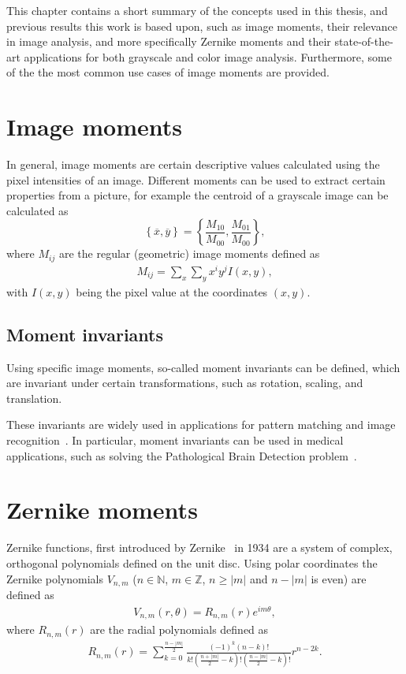 This chapter contains a short summary of the concepts used in this thesis, and previous results this work is based upon, such as image moments, their relevance in image analysis, and more specifically Zernike moments and their state-of-the-art applications for both grayscale and color image analysis. Furthermore, some of the the most common use cases of image moments are provided.

\section{Image moments}
In general, image moments are certain descriptive values calculated using the pixel intensities of an image. Different moments can be used to extract certain properties from a picture, for example the centroid of a grayscale image can be calculated as
$$
\left\{ \overline{x}, \overline{y} \right\} = \left\{ \frac{M_{10}}{M_{00}},  \frac{M_{01}}{M_{00}} \right\},
$$ where $M_{ij}$ are the regular (geometric) image moments defined as
\begin{gather}
M_{ij} =  \sum_x \sum_y x^i y^j I(x,y) \label{eq:regular_moment},
\end{gather} with $I(x,y)$ being the pixel value at the coordinates $(x,y)$.

\subsection{Moment invariants}
Using specific image moments, so-called moment invariants can be defined, which are invariant under certain transformations, such as rotation, scaling, and translation.

These invariants are widely used in applications for pattern matching and image recognition~\cite{app1, app2, app3}. In particular, moment invariants can be used in medical applications, such as solving the Pathological Brain Detection problem~\cite{med_app_1}.

\section{Zernike moments}
Zernike functions, first introduced by Zernike~\cite{zernike} in 1934 are a system of complex, orthogonal polynomials defined on the unit disc. Using polar coordinates the Zernike polynomials $V_{n,m}$ ($n \in \mathds{N}$, $m \in \mathds{Z}$, $n \geq |m|$ and $n - |m|$ is even) are defined as
\begin{gather*}
  V_{n,m}(r,\theta) = R_{n,m}(r) e^{i m\theta},
\end{gather*}
where $ R_{n,m}(r) $ are the radial polynomials defined as
\begin{gather}
  R_{n,m}(r) = \sum_{k=0}^{\frac{n - |m|}{2}}\frac{(-1)^k (n - k)!}{k!\left(\frac{n + |m|}{2} - k\right)!\left(\frac{n - |m|}{2} - k\right)!}r^{n-2k} \label{eq:radial_poly}.
\end{gather}

